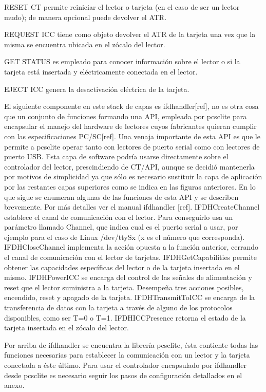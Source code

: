 RESET CT permite reiniciar el lector o tarjeta (en el caso de ser un lector mudo); de manera opcional puede devolver el ATR.

REQUEST ICC tiene como objeto devolver el ATR de la tarjeta una vez que la misma se encuentra ubicada en el zócalo del lector.

GET STATUS es empleado para conocer información sobre el lector o si la tarjeta está insertada y eléctricamente conectada en el lector. 

EJECT ICC genera la desactivación eléctrica de la tarjeta.

\bigskip
{}
El siguiente componente en este stack de capas es ifdhandler[ref], no es otra cosa que un conjunto de funciones formando una API, empleada por pcsclite para encapsular el manejo del hardware de  lectores cuyos fabricantes quieran cumplir con las especificaciones PC/SC[ref]. Una venaja importante de esta API es que le permite a pcsclite operar tanto con lectores de puerto serial como con lectores de puerto USB.
Esta capa de software podría usarse directamente sobre el controlador del lector, prescindiendo de CT/API, aunque se decidió mantenerla por motivos de simplicidad ya que sólo es necesario sustituir la capa de aplicación por las restantes capas superiores como se indica en las figuras anteriores.
En lo que sigue se enumeran algunas de las funciones de esta API y se describen brevemente. Por más detalles ver el manual ifdhandler [ref].
IFDHCreateChannel establece el canal de comunicación con el lector. Para conseguirlo usa un parámetro llamado Channel, que indica cual es el puerto serial a usar, por ejemplo para el caso de Linux /dev/ttySx (x es el número que corresponda).
IFDHCloseChannel implementa la acción opuesta a la función anterior, cerrando el canal de comunicación con el lector de tarjetas.
IFDHGetCapabilities permite obtener las capacidades específicas del lector o de la tarjeta insertada en el mismo.
IFDHPowerICC se encarga del control de las señales de alimentación y reset que el lector suministra a la tarjeta. Desempeña tres acciones posibles, encendido, reset y apagado de la tarjeta.
IFDHTransmitToICC se encarga de la transferencia de datos con la tarjeta a través de alguno de los protocolos disponibles, como ser T=0 o T=1.
IFDHICCPresence retorna el estado de la tarjeta insertada en el zócalo del lector.

\bigskip
{}
Por arriba de ifdhandler se encuentra la librería pcsclite, ésta contiente todas las funciones necesarias para establecer la comunicación con un lector y la tarjeta conectada a éste último. Para usar el controlador encapsulado por ifdhandler desde pcsclite es necesario seguir los pasos de configuración detallados en el anexo.

